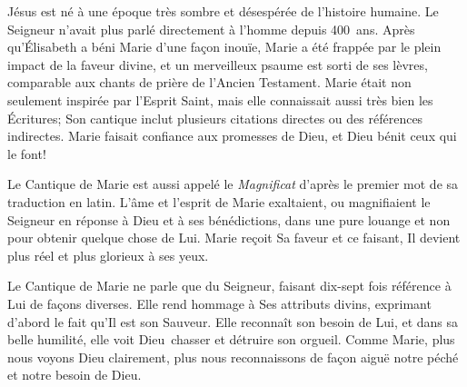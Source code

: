 


Jésus est né à une époque très sombre et désespérée de l'histoire humaine. Le Seigneur n'avait plus parlé directement à l'homme depuis 400~ans. Après qu'Élisabeth a béni Marie d'une façon inouïe, Marie a été frappée par le plein impact de la faveur divine, et un merveilleux psaume est sorti de ses lèvres, comparable aux chants de prière de l'Ancien Testament. Marie était non seulement inspirée par l'Esprit Saint, mais elle connaissait aussi très bien les Écritures; Son cantique inclut plusieurs citations directes ou des références indirectes. Marie faisait confiance aux promesses de Dieu, et Dieu bénit ceux qui le font!

Le Cantique de Marie est aussi appelé le \emph{Magnificat} d'après le premier mot de sa traduction en latin. L'âme et l'esprit de Marie exaltaient, ou \Og magnifiaient \Fg{} le Seigneur en réponse à Dieu et à ses bénédictions, dans une pure louange et non pour obtenir quelque chose de Lui. Marie reçoit Sa faveur et ce faisant, Il devient plus réel et plus glorieux à ses yeux.

Le Cantique de Marie ne parle que du Seigneur, faisant dix-sept fois référence à Lui de façons diverses. Elle rend hommage à Ses attributs divins, exprimant d'abord le fait qu'Il est son Sauveur. Elle reconnaît son besoin de Lui, et dans sa belle humilité, elle voit Dieu~chasser et détruire son orgueil. Comme Marie, plus nous voyons Dieu clairement, plus nous reconnaissons de façon aiguë notre péché et notre besoin de Dieu.

